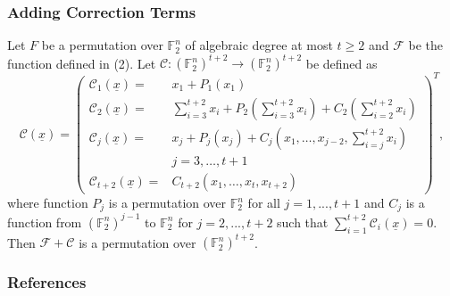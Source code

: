 \documentclass[
    aspectratio=169,                   %
]{beamer}
\newcommand{\F}{\mathbb{F}}
\begin{document}
    \begin{frame}
        \frametitle{Adding Correction Terms}
    
        
        Let $F$ be a permutation over $\mathbb{F}_2^n$ of algebraic degree at most $t \geq 2$ and $\mathcal{F}$ be the function defined in (2). Let $\mathcal{C}:\left(\mathbb{F}_2^n\right)^{t+2} \rightarrow\left(\mathbb{F}_2^n\right)^{t+2}$ be defined as
        \[
        \mathcal{C}(\underline{x})=\left(\begin{array}{ll}
        \mathcal{C}_1(\underline{x})= & x_1+P_1\left(x_1\right) \\
        \mathcal{C}_2(\underline{x})= & \sum_{i=3}^{t+2} x_i+P_2\left(\sum_{i=3}^{t+2} x_i\right)+C_2\left(\sum_{i=2}^{t+2} x_i\right) \\
        \mathcal{C}_j(\underline{x})= & x_j+P_j\left(x_j\right)+C_j\left(x_1, \ldots, x_{j-2}, \sum_{i=j}^{t+2} x_i\right) \\
        & j=3, \ldots, t+1 \\
        \mathcal{C}_{t+2}(\underline{x})= & C_{t+2}\left(x_1, \ldots, x_t, x_{t+2}\right)
        \end{array}\right)^T,
        \]
        where function $ P_j $ is a permutation over $ \F_{2}^n $ for all $ j=1,...,t+1 $ and $ C_j $ is a function 
        from $ (\F_2^n)^{j-1} $ to $ \F_2^n $ for $ j=2,...,t+2 $ such that $ \sum_{i=1}^{t+2}\mathcal{C}_i(\underline{x})=0 $.
        Then $ \mathcal{F}+\mathcal{C} $ is a permutation over $(\F_2^n)^{t+2}  $.
    \end{frame}

    \makebottom     %

    
    \begin{frame}[t,allowframebreaks]
        \nocite{*}
        \frametitle{References}
        \printbibliography
    \end{frame}
\end{document}
